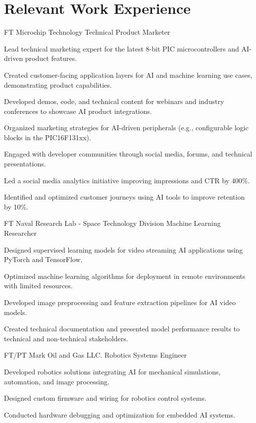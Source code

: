 \documentclass[12pt]{FreemanCV}
\begin{document}
\section{Relevant Work Experience}

 {FT} {Microchip Technology} {Technical Product Marketer}
{ \item Lead technical marketing expert for the latest 8-bit PIC microcontrollers and AI-driven product features. \item Created customer-facing application layers for AI and machine learning use cases, demonstrating product capabilities. \item Developed demos, code, and technical content for webinars and industry conferences to showcase AI product integrations. \item Organized marketing strategies for AI-driven peripherals (e.g., configurable logic blocks in the PIC16F131xx). \item Engaged with developer communities through social media, forums, and technical presentations. \item Led a social media analytics initiative improving impressions and CTR by 400\%. \item Identified and optimized customer journeys using AI tools to improve retention by 10\%. }

 {FT} {Naval Research Lab - Space Technology Division} {Machine Learning Researcher} { \item Designed supervised learning models for video streaming AI applications using PyTorch and TensorFlow. \item Optimized machine learning algorithms for deployment in remote environments with limited resources. \item Developed image preprocessing and feature extraction pipelines for AI video models. \item Created technical documentation and presented model performance results to technical and non-technical stakeholders. }

 {FT/PT} {Mark Oil and Gas LLC.} {Robotics Systems Engineer} { \item Developed robotics solutions integrating AI for mechanical simulations, automation, and image processing. \item Designed custom firmware and wiring for robotics control systems. \item Conducted hardware debugging and optimization for embedded AI systems. }
\end{document}
